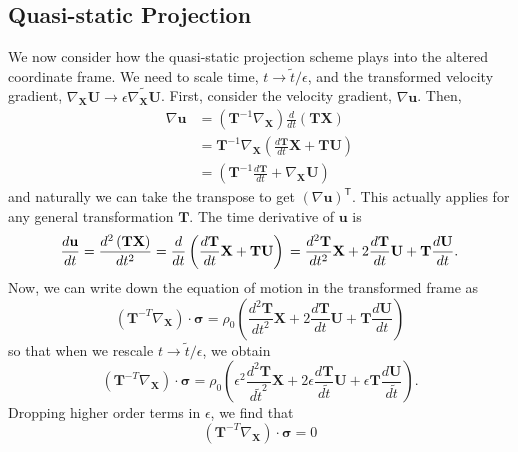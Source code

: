 \documentclass[11pt]{article}
\newcommand{\bsig}{\boldsymbol\sigma}
\newcommand{\bT}{\mathbf{T}}
\newcommand{\bU}{\mathbf{U}}
\newcommand{\bX}{\mathbf{X}}
\newcommand{\bu}{\mathbf{u}}
\newcommand{\Trans}{\mathsf{T}}
\begin{document}
\subsection*{Quasi-static Projection}
We now consider how the quasi-static projection scheme plays into the altered coordinate frame. We need to scale time, $t\rightarrow \tilde{t}/\epsilon$, and the transformed velocity gradient, $\nabla_\bX\bU\rightarrow\epsilon\widetilde{\nabla_\bX\bU}$. First, consider the velocity gradient, $\nabla\bu$. Then,
\begin{align*}
    \nabla\bu &= \left(\bT^{-1}\nabla_\bX\right)\frac{d}{dt}\left(\bT\bX\right)\\
    &= \bT^{-1}\nabla_\bX\left(\frac{d\bT}{dt}\bX + \bT\bU\right)\\
    &= \left(\bT^{-1}\frac{d\bT}{dt} + \nabla_\bX\bU\right)
\end{align*}
and naturally we can take the transpose to get $\left(\nabla\bu\right)^\Trans$. This actually applies for any general transformation $\bT$. The time derivative of $\bu$ is
\begin{equation}
  \frac{d\bu}{dt} = \frac{d^2\left(\bT\bX\right)}{dt^2}\\
  = \frac{d}{dt}\left(\frac{d\bT}{dt}\bX + \bT\bU\right)\\
  = \frac{d^2\bT}{dt^2}\bX + 2\frac{d\bT}{dt}\bU + \bT\frac{d\bU}{dt}.
\end{equation}
Now, we can write down the equation of motion in the transformed frame as
\begin{equation}
    \left(\bT^{-T}\nabla_\bX\right)\cdot\bsig = \rho_0\left(\frac{d^2\bT}{dt^2}\bX + 2\frac{d\bT}{dt}\bU + \bT\frac{d\bU}{dt}\right)
    \label{eqn:eqn_of_motion}
\end{equation}
so that when we rescale $t\rightarrow\tilde{t}/\epsilon$, we obtain
\begin{equation}
    \left(\bT^{-T}\nabla_\bX\right)\cdot\bsig = \rho_0\left(\epsilon^2\frac{d^2\bT}{d\tilde{t}^2}\bX + 2\epsilon\frac{d\bT}{d\tilde{t}}\bU + \epsilon\bT\frac{d\bU}{d\tilde{t}}\right).
    \label{eqn:eqn_of_motion_rescaled}
\end{equation}
Dropping higher order terms in $\epsilon$, we find that
\begin{equation}
    \left(\bT^{-T}\nabla_\bX\right)\cdot\bsig = 0
  \label{eqn:quasi_static_sigma}
\end{equation}
\end{document}
